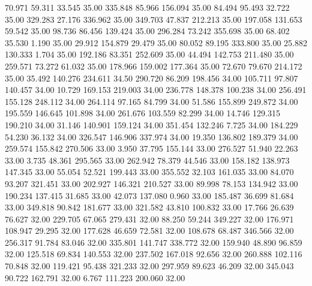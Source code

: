   70.971   59.311   33.545        35.00
 335.848   85.966  156.094        35.00
  84.494   95.493   32.722        35.00
 329.283   27.176  336.962        35.00
 349.703   47.837  212.213        35.00
 197.058  131.653   59.542        35.00
  98.736   86.456  139.424        35.00
 296.284   73.242  355.698        35.00
  68.402   35.530    1.190        35.00
  29.912  154.879   29.479        35.00
  80.052   89.195  333.800        35.00
  25.882  130.333    1.704        35.00
 192.186   83.351  252.609        35.00
  44.494  142.753  211.480        35.00
 259.571   73.272   61.032        35.00
 178.966  159.002  177.364        35.00
  72.670   79.670  214.172        35.00
  35.492  140.276  234.611        34.50
 290.720   86.209  198.456        34.00
 105.711   97.807  140.457        34.00
  10.729  169.153  219.003        34.00
 236.778  148.378  100.238        34.00
 256.491  155.128  248.112        34.00
 264.114   97.165   84.799        34.00
  51.586  155.899  249.872        34.00
 195.559  146.645  101.898        34.00
 261.676  103.559   82.299        34.00
  14.746  129.315  190.210        34.00
  31.146  140.901  159.124        34.00
 351.454  132.246    7.725        34.00
 184.229   54.230   36.132        34.00
 326.547  146.906  337.974        34.00
  19.350  136.802  189.379        34.00
 259.574  155.842  270.506        33.00
   3.950   37.795  155.144        33.00
 276.527   51.940   22.263        33.00
   3.735   48.361  295.565        33.00
 262.942   78.379   44.546        33.00
 158.182  138.973  147.345        33.00
  55.054   52.521  199.443        33.00
 355.552   32.103  161.035        33.00
  84.070   93.207  321.451        33.00
 202.927  146.321  210.527        33.00
  89.998   78.153  134.942        33.00
 190.234  137.415   31.685        33.00
  42.073  137.080    0.960        33.00
 185.487   36.699   81.684        33.00
 349.818   90.842  181.677        33.00
 321.582   43.810  100.832        33.00
  17.766   26.639   76.627        32.00
 229.705   67.065  279.431        32.00
  88.250   59.244  349.227        32.00
 176.971  108.947   29.295        32.00
 177.628   46.659   72.581        32.00
 108.678   68.487  346.566        32.00
 256.317   91.784   83.046        32.00
 335.801  141.747  338.772        32.00
 159.940   48.890   96.859        32.00
 125.518   69.834  140.553        32.00
 237.502  167.018   92.656        32.00
 260.888  102.116   70.848        32.00
 119.421   95.438  321.233        32.00
 297.959   89.623   46.209        32.00
 345.043   90.722  162.791        32.00
   6.767  111.223  200.060        32.00
